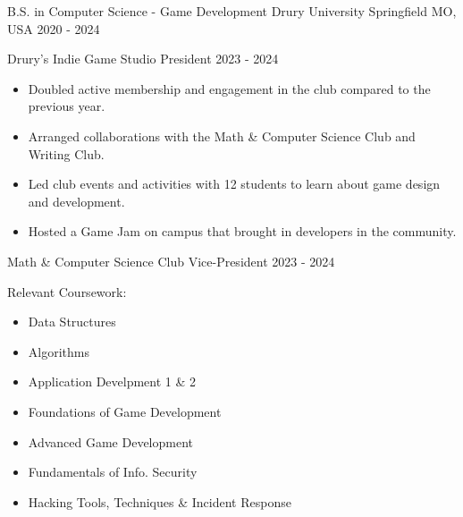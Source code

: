 

\begin{cventries}

  \cventry
    {B.S. in Computer Science - Game Development} %
    {Drury University} %
    {Springfield MO, USA} %
    {2020 - 2024} %
    {
      \begin{cvitems} %
        \item {Drury's Indie Game Studio President 2023 - 2024}
            \newline
            \begin{itemize}
                \item {Doubled active membership and engagement in the club compared to the previous year.}
                \item {Arranged collaborations with the Math \& Computer Science Club and Writing Club.}
                \item {Led club events and activities with 12 students to learn about game design and development.}
                \item {Hosted a Game Jam on campus that brought in developers in the community.}
            \end{itemize}
        \item {Math \& Computer Science Club Vice-President 2023 - 2024}
	\item {Relevant Coursework:}
		\newline
		\begin{itemize}
			\item {Data Structures}
			\item {Algorithms}
			\item {Application Develpment 1 \& 2}
			\item {Foundations of Game Development}
			\item {Advanced Game Development}
			\item {Fundamentals of Info. Security}
			\item {Hacking Tools, Techniques \& Incident Response}
		\end{itemize}
      \end{cvitems}
    }

\end{cventries}
